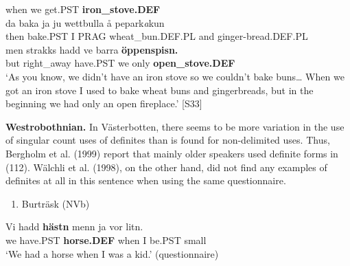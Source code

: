 when  we  get.PST  \textbf{iron\_stove.DEF}\\ %


\ea\label{}
\gll da  baka  ja  ju  wettbulla  å  pepark\textit{a}kun\\


then  bake.PST  I  PRAG  wheat\_bun.DEF.PL  and  ginger-bread.DEF.PL\\ %


\ea\label{}
\gll men  strakks  hadd  ve  barra  \textbf{öppenspisn.}\\


but  right\_away  have.PST  we  only  \textbf{open\_stove.DEF}\\ %


‘As you know, we didn’t have an iron stove so we couldn’t bake buns… When we got an iron stove I used to bake wheat buns and gingerbreads, but in the beginning we had only an open fireplace.’ [S33]
\z

\textbf{Westrobothnian.} In Västerbotten, there seems to be more variation in the use of singular count uses of definites than is found for non-delimited uses. Thus, Bergholm et al. (1999) report that mainly older speakers used definite forms in (112). Wälchli et al. (1998), on the other hand, did not find any examples of definites at all in this sentence when using the same questionnaire.

\begin{enumerate} %
\item 
\label{bkm:Ref224103495}Burträsk (NVb)

\end{enumerate} %
\ea\label{}
\gll Vi  hadd  \textbf{hästn} menn  ja  vor  litn.\\


we  have.PST  \textbf{horse.DEF} when  I   be.PST  small\\ %


‘We had a horse when I was a kid.’ (questionnaire)
\z



